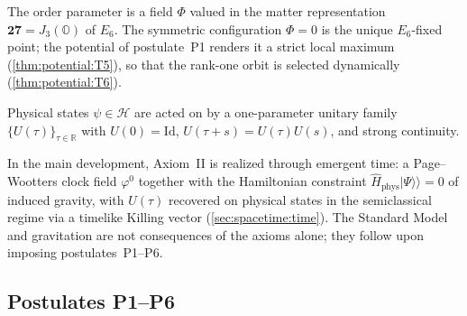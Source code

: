 \begin{axiom}\label{ax:intro:I}
The order parameter is a field $\Phi$ valued in the matter representation
$\mathbf{27}=J_3(\mathbb{O})$ of $E_6$. The symmetric configuration $\Phi=0$ is
the unique $E_6$-fixed point; the potential of postulate~\textnormal{P1} renders
it a strict local maximum (\autoref{thm:potential:T5}), so that the rank-one
orbit is selected dynamically (\autoref{thm:potential:T6}).
\end{axiom}

\begin{axiom}\label{ax:intro:II}
Physical states $\psi\in\mathcal{H}$ are acted on by a one-parameter unitary
family $\{U(\tau)\}_{\tau\in\mathbb{R}}$ with $U(0)=\mathrm{Id}$,
$U(\tau+s)=U(\tau)U(s)$, and strong continuity.
\end{axiom}

In the main development, Axiom~II is realized through emergent time: a
Page--Wootters clock field $\varphi^{0}$ together with the Hamiltonian constraint
$\hat{H}_{\mathrm{phys}}\lvert\Psi\rangle\!\rangle=0$ of induced gravity, with
$U(\tau)$ recovered on physical states in the semiclassical regime via a timelike
Killing vector (\autoref{sec:spacetime:time}). The Standard Model and
gravitation are not consequences of the axioms alone; they follow upon imposing
postulates~\textnormal{P1--P6}.

\subsection{Postulates \textnormal{P1--P6}}
\label{sec:intro:postulates}

